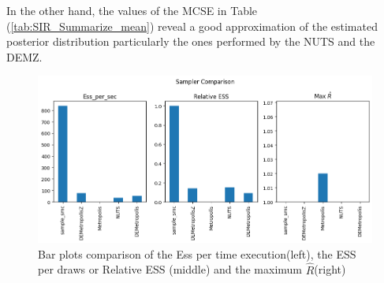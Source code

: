 \documentclass[nonatbib,preprint,12pt,authoryear]{elsarticle}
\begin{document}
In the other hand, the values of the MCSE in Table (\ref{tab:SIR_Summarize_mean}) reveal a good approximation of the estimated posterior distribution particularly the ones performed by the NUTS and the DEMZ.
\begin{figure}[H]
    \centering
    \includegraphics[width=0.9\linewidth, height = 0.5\linewidth]{Figures/Result_Model1/best_res_Ess_Rel_Ess_Rhat_without_init.png}
    \caption{Bar plots comparison of the Ess per time execution(left), the ESS per draws or Relative ESS (middle) and the maximum $\hat{R}$(right)}
    \label{fig:SIR_Bar_plot_Comparison}
\end{figure}
\end{document}
